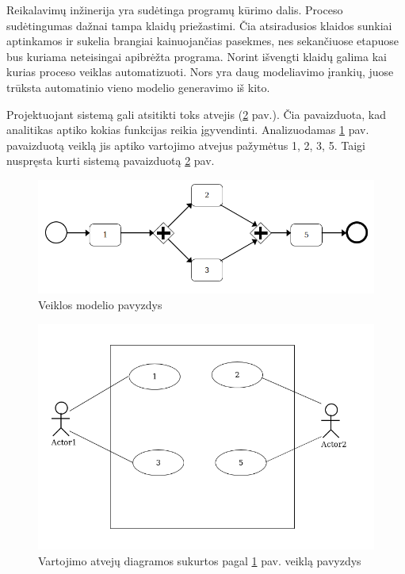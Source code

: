 \documentclass{VUMIFInfBakalaurinis}
\begin{document}
Reikalavimų inžinerija yra sudėtinga programų kūrimo dalis. Proceso sudėtingumas dažnai tampa klaidų priežastimi. Čia atsiradusios klaidos sunkiai aptinkamos ir sukelia brangiai kainuojančias pasekmes, nes sekančiuose etapuose bus kuriama neteisingai apibrėžta programa. Norint išvengti klaidų galima kai kurias proceso veiklas automatizuoti. Nors yra daug modeliavimo įrankių, juose trūksta automatinio vieno modelio generavimo iš kito.

Projektuojant sistemą gali atsitikti toks atvejis (\ref{img:bad_model_use_cases} pav.). Čia pavaizduota, kad analitikas aptiko kokias funkcijas reikia įgyvendinti. Analizuodamas \ref{img:bad_model} pav. pavaizduotą veiklą jis aptiko vartojimo atvejus pažymėtus 1, 2, 3, 5. Taigi nuspręsta kurti sistemą pavaizduotą  \ref{img:bad_model_use_cases} pav.

\begin{figure}[H]
	\centering
	\includegraphics[width=\textwidth]{img/bad_modeling/bad_model}
	\caption{Veiklos modelio pavyzdys}
	\label{img:bad_model}
\end{figure}
\begin{figure}[H]
	\centering
	\includegraphics[width=15cm]{img/bad_modeling/bad_model_use_cases}
	\caption{Vartojimo atvejų diagramos sukurtos pagal \ref{img:bad_model} pav. veiklą pavyzdys}
	\label{img:bad_model_use_cases}
\end{figure}
\end{document}
